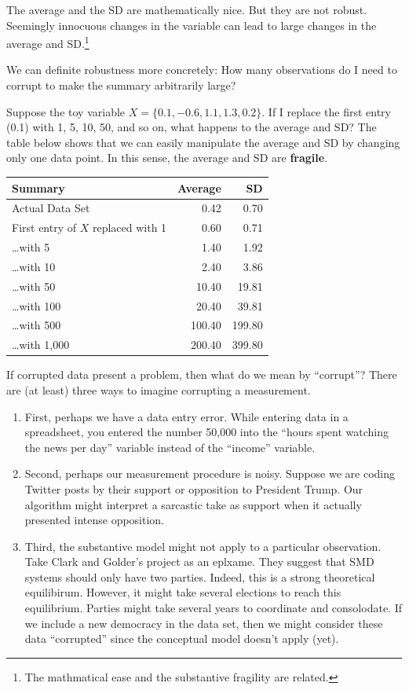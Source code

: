 \documentclass[]{book}
\providecommand{\tightlist}{%
  \setlength{\itemsep}{0pt}\setlength{\parskip}{0pt}}
\let\rmarkdownfootnote\footnote%
\def\footnote{\protect\rmarkdownfootnote}
\begin{document}
The average and the SD are mathematically nice. But they are not robust. Seemingly innocuous changes in the variable can lead to large changes in the average and SD.\footnote{The mathmatical ease and the substantive fragility are related.}

We can definite robustness more concretely: How many observations do I need to corrupt to make the summary arbitrarily large?

Suppose the toy variable \(X = \{0.1, -0.6, 1.1, 1.3, 0.2\}\). If I replace the first entry (0.1) with 1, 5, 10, 50, and so on, what happens to the average and SD? The table below shows that we can easily manipulate the average and SD by changing only one data point. In this sense, the average and SD are \textbf{fragile}.

\begin{longtable}[]{@{}lrr@{}}
\toprule
Summary & Average & SD\tabularnewline
\midrule
\endhead
Actual Data Set & 0.42 & 0.70\tabularnewline
First entry of \(X\) replaced with 1 & 0.60 & 0.71\tabularnewline
\ldots with 5 & 1.40 & 1.92\tabularnewline
\ldots with 10 & 2.40 & 3.86\tabularnewline
\ldots with 50 & 10.40 & 19.81\tabularnewline
\ldots with 100 & 20.40 & 39.81\tabularnewline
\ldots with 500 & 100.40 & 199.80\tabularnewline
\ldots with 1,000 & 200.40 & 399.80\tabularnewline
\bottomrule
\end{longtable}

If corrupted data present a problem, then what do we mean by ``corrupt''? There are (at least) three ways to imagine corrupting a measurement.

\begin{enumerate}
\def\labelenumi{\arabic{enumi}.}
\tightlist
\item
  First, perhaps we have a data entry error. While entering data in a spreadsheet, you entered the number 50,000 into the ``hours spent watching the news per day'' variable instead of the ``income'' variable.
\item
  Second, perhaps our measurement procedure is noisy. Suppose we are coding Twitter posts by their support or opposition to President Trump. Our algorithm might interpret a sarcastic take as support when it actually presented intense opposition.
\item
  Third, the substantive model might not apply to a particular observation. Take Clark and Golder's project as an eplxame. They suggest that SMD systems should only have two parties. Indeed, this is a strong theoretical equilibirum. However, it might take several elections to reach this equilibrium. Parties might take several years to coordinate and consolodate. If we include a new democracy in the data set, then we might consider these data ``corrupted'' since the conceptual model doesn't apply (yet).
\end{enumerate}
\end{document}
